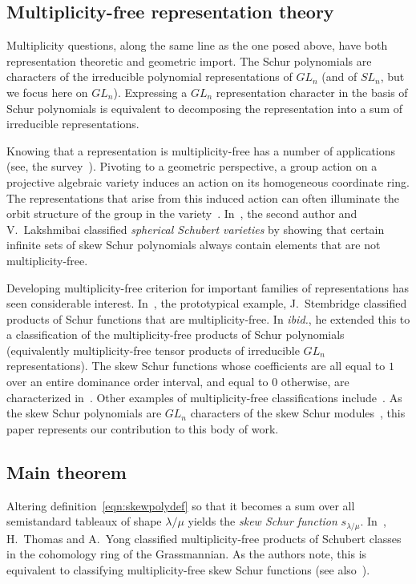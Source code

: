 \documentclass[ALCO,ThmDefs,Unicode,epreuves]{cedram}
\begin{document}
\subsection{Multiplicity-free representation theory} Multiplicity questions, along the same line as the one posed above, have both representation theoretic and geometric import. The Schur polynomials are characters of the irreducible polynomial representations of $GL_n$ (and of $SL_n$, but we focus here on $GL_n$). Expressing a $GL_n$ representation character in the basis of Schur polynomials is equivalent to decomposing the representation into a sum of irreducible representations. 

Knowing that a representation is multiplicity-free has a number of applications (see, \eg the survey~\cite{H95}). Pivoting to a geometric perspective, a group action on a projective algebraic variety induces an action on its homogeneous coordinate ring. The representations that arise from this induced action can often illuminate the orbit structure of the group in the variety~\cite{AP14,MWZ01,P14,S03}. In~\cite{HL19}, the second author and V.~Lakshmibai classified \emph{spherical Schubert varieties} by showing that certain infinite sets of skew Schur polynomials always contain elements that are not multiplicity-free. 

Developing multiplicity-free criterion for important families of representations has seen considerable interest. In~\cite{S01}, the prototypical example, J.~Stembridge classified products of Schur functions that are multiplicity-free. In \emph{ibid.}, he extended this to a classification of the multiplicity-free products of Schur polynomials (equivalently multiplicity-free tensor products of irreducible $GL_n$ representations). The skew Schur functions whose coefficients are all equal to $1$ over an entire dominance order interval, and equal to $0$ otherwise, are characterized in~\cite{ACM19}. Other examples of multiplicity-free classifications include~\cite{FMS19,G10,TY10}. As the skew Schur polynomials are $GL_n$ characters of the skew Schur modules~\cite{FH91}, this paper represents our contribution to this body of work. 

\subsection{Main theorem} Altering definition~\eqref{eqn:skewpolydef} so that it becomes a sum over all semistandard tableaux of shape $\lambda / \mu$ yields the \emph{skew Schur function} $s_{\lambda / \mu}$. In~\cite{TY10}, H.~Thomas and A.~Yong classified multiplicity-free products of Schubert classes in the cohomology ring of the Grassmannian. As the authors note, this is equivalent to classifying multiplicity-free skew Schur functions (see also~\cite{G10}). 
\end{document}
